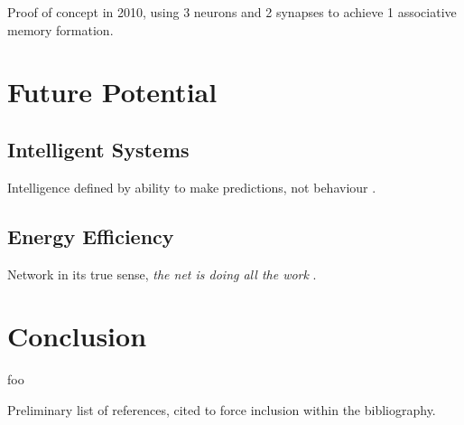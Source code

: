 \documentclass[12pt, a4paper]{article}
\begin{document}

Proof of concept in 2010, using 3 neurons and 2 synapses to achieve 1 associative memory formation.


\section{Future Potential}

\subsection{Intelligent Systems}

Intelligence defined by ability to make predictions, not behaviour \cite{intelligence_is_prediction}.

\subsection{Energy Efficiency}

Network in its true sense, \textit{the net is doing all the work} \cite{net_doing_all_the_work}.

\cite{ahah}




\section{Conclusion}

foo


Preliminary list of references, cited to force inclusion within the bibliography.
\end{document}

